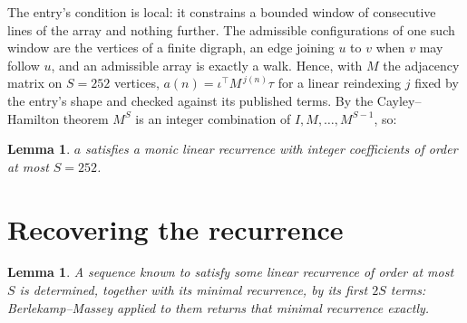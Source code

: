 \documentclass[11pt,a4paper]{article}
\theoremstyle{plain}
\newtheorem{lemma}[theorem]{Lemma}
\theoremstyle{definition}
\begin{document}
The entry's condition is local: it constrains a bounded window of consecutive lines of the
array and nothing further. The admissible configurations of one such window are the vertices
of a finite digraph, an edge joining $u$ to $v$ when $v$ may follow $u$, and an admissible
array is exactly a walk. Hence, with $M$ the adjacency matrix on $S=252$ vertices,
$a(n)=\iota^{\!\top}M^{\,j(n)}\tau$ for a linear reindexing $j$ fixed by the entry's shape
and checked against its published terms. By the Cayley--Hamilton theorem $M^{S}$ is an
integer combination of $I,M,\dots,M^{S-1}$, so:

\begin{lemma}\label{lem:cf}
$a$ satisfies a monic linear recurrence with integer coefficients of order at most $S=252$.
\end{lemma}

\section{Recovering the recurrence}

\begin{lemma}\label{lem:bm}
A sequence known to satisfy some linear recurrence of order at most $S$ is determined, together
with its minimal recurrence, by its first $2S$ terms: Berlekamp--Massey applied to them returns
that minimal recurrence exactly.
\end{lemma}
\end{document}
